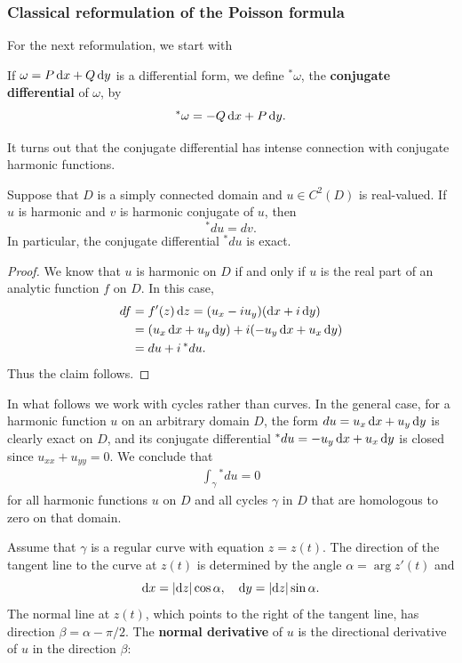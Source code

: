 \subsubsection{Classical reformulation of the Poisson formula}
For the next reformulation, we start with
\begin{definition}
If $\omega=P\mathop{}\!\mathrm{d} x+Q\mathop{}\!\mathrm{d} y$ is a differential form, we define $^{\ast}\omega$, the \textbf{conjugate differential} of $\omega$, by
\[^{\ast}\omega=-Q\mathop{}\!\mathrm{d} x+P\mathop{}\!\mathrm{d} y.\]
\end{definition}
It turns out that the conjugate differential has intense connection with conjugate harmonic functions.
\begin{proposition}\label{conjugate differential is harmonic conjugate}
Suppose that $D$ is a simply connected domain and $u\in C^2(D)$ is real-valued. If $u$ is harmonic and $v$ is harmonic conjugate of $u$, then
\[^{\ast}du=dv.\]
In particular, the conjugate differential $^{\ast}du$ is exact.
\end{proposition}
\begin{proof}
We know that $u$ is harmonic on $D$ if and only if $u$ is the real part of an analytic function $f$ on $D$. In this case,
\begin{align*}
df&=f'(z)\mathop{}\!\mathrm{d} z=(u_x-iu_y)(\mathop{}\!\mathrm{d} x+i\mathop{}\!\mathrm{d} y)\\
&=(u_x\mathop{}\!\mathrm{d} x+u_y\mathop{}\!\mathrm{d} y)+i(-u_y\mathop{}\!\mathrm{d} x+u_x\mathop{}\!\mathrm{d} y)\\
&=du+i\,{^{\ast}du}.
\end{align*}
Thus the claim follows.
\end{proof}
In what follows we work with cycles rather than curves. In the general case, for a harmonic function $u$ on an arbitrary domain $D$, the form $du=u_x\mathop{}\!\mathrm{d} x+u_y\mathop{}\!\mathrm{d} y$ is clearly exact on $D$, and its conjugate differential $^{\ast}du=-u_y\mathop{}\!\mathrm{d} x+u_x\mathop{}\!\mathrm{d} y$ is closed since $u_{xx}+u_{yy}=0$. We conclude that
\begin{align}\label{integral of conjugate form}
\int_{\gamma}{^{\ast}du}=0
\end{align}
for all harmonic functions $u$ on $D$ and all cycles $\gamma$ in $D$ that are homologous to zero on that domain.\par
Assume that $\gamma$ is a regular curve with equation $z=z(t)$. The direction of the tangent line to the curve at $z(t)$ is determined by the angle $\alpha=\arg z'(t)$ and
\[\mathop{}\!\mathrm{d} x=|\mathrm{d}z|\cos\alpha,\quad \mathop{}\!\mathrm{d} y=|\mathrm{d}z|\sin\alpha.\]
The normal line at $z(t)$, which points to the right of the tangent line, has direction $\beta=\alpha-\pi/2$. The \textbf{normal derivative} of $u$ is the directional derivative of $u$ in the direction $\beta$:
